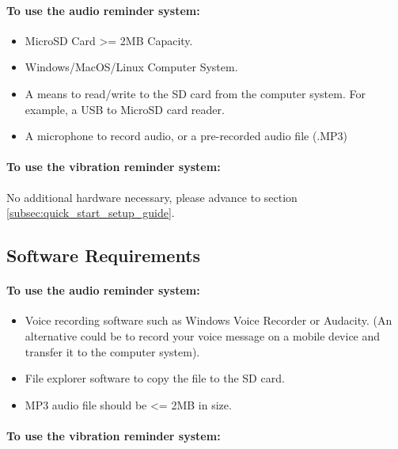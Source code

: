 			\paragraph{To use the audio reminder system:}\mbox{}

			\begin{itemize}
				\item MicroSD Card >= 2MB Capacity.
				\item Windows/MacOS/Linux Computer System.
				\item A means to read/write to the SD card from the computer system. For example, a USB to MicroSD card reader.
				\item A microphone to record audio, or a pre-recorded audio file (.MP3)
			\end{itemize}

			\paragraph{To use the vibration reminder system:}\mbox{}

			No additional hardware necessary, please advance to section \ref{subsec:quick_start_setup_guide}.

		\subsection{Software Requirements}
		\label{subsec:quick_start_guide_software}

			\paragraph{To use the audio reminder system:}\mbox{}

			\begin{itemize}
				\item Voice recording software such as Windows Voice Recorder or Audacity. (An alternative could be to record your voice message on a mobile device and transfer it to the computer system).
				\item File explorer software to copy the file to the SD card.
				\item MP3 audio file should be <= 2MB in size.
			\end{itemize}

			\paragraph{To use the vibration reminder system:}\mbox{}

